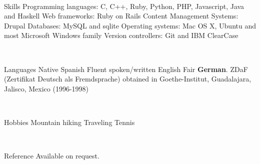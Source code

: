 \documentclass{resume}
\begin{document}
\\
\begin{category}{Skills}
\citembullet Programming languages: C, C++, Ruby, Python, PHP, Javascript, Java and Haskell
\citembullet Web frameworks: Ruby on Rails
\citembullet Content Management Systems: Drupal
\citembullet Databases: MySQL and  sqlite
\citembullet Operating systems: Mac OS X, Ubuntu and most Microsoft Windows family
\citembullet Version controllers: Git and IBM ClearCase
\end{category}
\\
\begin{category}{Languages}
\citembullet Native Spanish
\citembullet Fluent spoken/written English
\citembullet Fair \textbf{German}. ZDaF (Zertifikat Deutsch als Fremdsprache) obtained in Goethe-Institut, Guadalajara, Jalisco, Mexico (1996-1998)
\end{category}
\\

\begin{category}{Hobbies}
\citembullet Mountain hiking
\citembullet Traveling
\citembullet Tennis
\end{category}
\\
\begin{category}{Reference} 
\citemnobullet Available on request.
\end{category}
\end{document}
